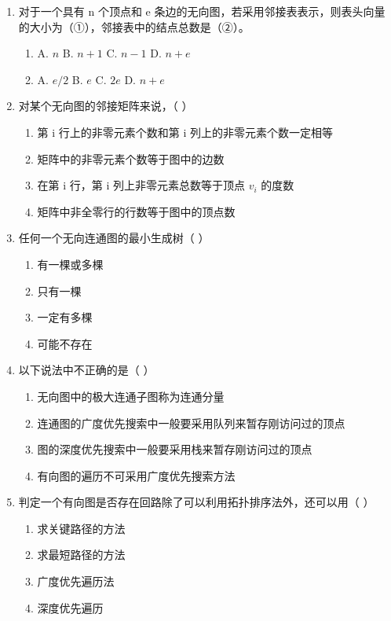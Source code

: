 \documentclass[12pt, a4paper]{article}
\begin{document}
\begin{enumerate}[label=\arabic*.]
	\item 对于一个具有 n 个顶点和 e 条边的无向图，若采用邻接表表示，则表头向量的大小为（①），邻接表中的结点总数是（②）。
	      \begin{enumerate}
		      \item[①] A. $n$ \quad B. $n+1$ \quad C. $n-1$ \quad D. $n+e$
		      \item[②] A. $e/2$ \quad B. $e$ \quad C. $2e$ \quad D. $n+e$
	      \end{enumerate}

	\item 对某个无向图的邻接矩阵来说，（ ）
	      \begin{enumerate}
		      \item[A.] 第 i 行上的非零元素个数和第 i 列上的非零元素个数一定相等
		      \item[B.] 矩阵中的非零元素个数等于图中的边数
		      \item[C.] 在第 i 行，第 i 列上非零元素总数等于顶点 $v_i$ 的度数
		      \item[D.] 矩阵中非全零行的行数等于图中的顶点数
	      \end{enumerate}

	\item 任何一个无向连通图的最小生成树（ ）
	      \begin{enumerate}
		      \item[A.] 有一棵或多棵
		      \item[B.] 只有一棵
		      \item[C.] 一定有多棵
		      \item[D.] 可能不存在
	      \end{enumerate}

	\item 以下说法中不正确的是（ ）
	      \begin{enumerate}
		      \item[A.] 无向图中的极大连通子图称为连通分量
		      \item[B.] 连通图的广度优先搜索中一般要采用队列来暂存刚访问过的顶点
		      \item[C.] 图的深度优先搜索中一般要采用栈来暂存刚访问过的顶点
		      \item[D.] 有向图的遍历不可采用广度优先搜索方法
	      \end{enumerate}

	\item 判定一个有向图是否存在回路除了可以利用拓扑排序法外，还可以用（ ）
	      \begin{enumerate}
		      \item[A.] 求关键路径的方法
		      \item[B.] 求最短路径的方法
		      \item[C.] 广度优先遍历法
		      \item[D.] 深度优先遍历
	      \end{enumerate}


\end{enumerate}
\end{document}

